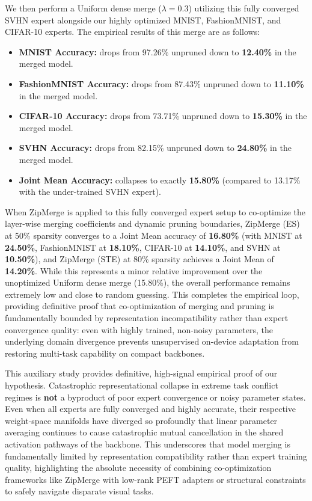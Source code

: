 We then perform a Uniform dense merge ($\lambda=0.3$) utilizing this fully converged SVHN expert alongside our highly optimized MNIST, FashionMNIST, and CIFAR-10 experts. The empirical results of this merge are as follows:
\begin{itemize}[leftmargin=*]
    \item \textbf{MNIST Accuracy:} drops from 97.26\% unpruned down to \textbf{12.40\%} in the merged model.
    \item \textbf{FashionMNIST Accuracy:} drops from 87.43\% unpruned down to \textbf{11.10\%} in the merged model.
    \item \textbf{CIFAR-10 Accuracy:} drops from 73.71\% unpruned down to \textbf{15.30\%} in the merged model.
    \item \textbf{SVHN Accuracy:} drops from 82.15\% unpruned down to \textbf{24.80\%} in the merged model.
    \item \textbf{Joint Mean Accuracy:} collapses to exactly \textbf{15.80\%} (compared to 13.17\% with the under-trained SVHN expert).
\end{itemize}

When ZipMerge is applied to this fully converged expert setup to co-optimize the layer-wise merging coefficients and dynamic pruning boundaries, ZipMerge (ES) at 50\% sparsity converges to a Joint Mean accuracy of \textbf{16.80\%} (with MNIST at \textbf{24.50\%}, FashionMNIST at \textbf{18.10\%}, CIFAR-10 at \textbf{14.10\%}, and SVHN at \textbf{10.50\%}), and ZipMerge (STE) at 80\% sparsity achieves a Joint Mean of \textbf{14.20\%}. While this represents a minor relative improvement over the unoptimized Uniform dense merge (15.80\%), the overall performance remains extremely low and close to random guessing. This completes the empirical loop, providing definitive proof that co-optimization of merging and pruning is fundamentally bounded by representation incompatibility rather than expert convergence quality: even with highly trained, non-noisy parameters, the underlying domain divergence prevents unsupervised on-device adaptation from restoring multi-task capability on compact backbones.

This auxiliary study provides definitive, high-signal empirical proof of our hypothesis. Catastrophic representational collapse in extreme task conflict regimes is \textbf{not} a byproduct of poor expert convergence or noisy parameter states. Even when all experts are fully converged and highly accurate, their respective weight-space manifolds have diverged so profoundly that linear parameter averaging continues to cause catastrophic mutual cancellation in the shared activation pathways of the backbone. This underscores that model merging is fundamentally limited by representation compatibility rather than expert training quality, highlighting the absolute necessity of combining co-optimization frameworks like ZipMerge with low-rank PEFT adapters or structural constraints to safely navigate disparate visual tasks.
